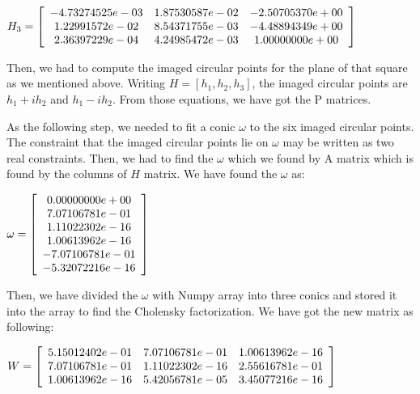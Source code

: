 \documentclass[]{article}
\begin{document}
\vspace{0.5em}


\centerline {
	$H_3 =\left[ {\begin{array}{*{20}c}
		-4.73274525e-03 & 1.87530587e-02 & -2.50705370e+00 \\
		1.22991572e-02 & 8.54371755e-03 & -4.48894349e+00  \\ 
		2.36397229e-04 & 4.24985472e-03 & 1.00000000e+00
		\end{array} } \right] $
}

\vspace{0.5em}

Then, we had to compute the imaged circular points for the plane of that square as we mentioned above. Writing $H=[h_1, h_2, h_3]$, the imaged circular points are $h_1 +ih_2$ and $h_1 - ih_2$. From those equations, we have got the P matrices.


As the following step, we needed to fit a conic $\omega$ to the six imaged circular points. The constraint that the imaged circular points lie on $\omega$ may be written as two real constraints. Then, we had to find the $\omega$ which we found by A matrix which is found by the columns of $H$ matrix. We have found the $\omega$ as:

\vspace{0.5em}

\centerline {
	$ \omega =\left[ {\begin{array}{*{20}c}
		0.00000000e+00 \\
		7.07106781e-01 \\
		1.11022302e-16 \\
		1.00613962e-16 \\ 
		-7.07106781e-01 \\
		-5.32072216e-16
		\end{array} } \right] $
}

\vspace{0.5em}

Then, we have divided the $\omega$ with Numpy array into three conics and stored it into the array to find the Cholensky factorization. We have got the new matrix as following:

\vspace{0.5em}

\centerline {
	$ W =\left[ {\begin{array}{*{20}c}
		5.15012402e-01 & 7.07106781e-01 & 1.00613962e-16 \\
		7.07106781e-01 & 1.11022302e-16 & 2.55616781e-01\\
		1.00613962e-16 & 5.42056781e-05 & 3.45077216e-16 
		\end{array} } \right] $
}
\end{document}
